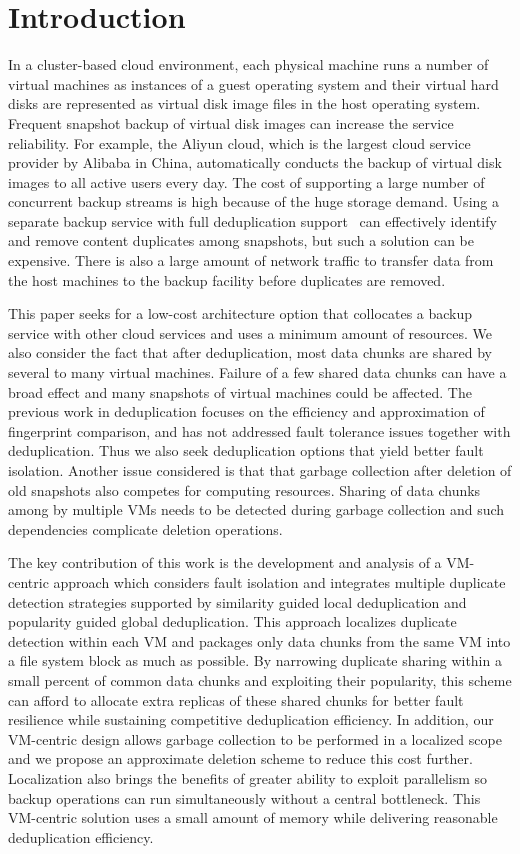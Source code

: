 \section{Introduction}
In a cluster-based cloud environment,
each physical machine runs a number  of virtual machines as  instances of a guest operating system 
and their  virtual hard disks are represented as virtual disk image files in the host operating system.
Frequent  snapshot backup of virtual disk images  can increase  the service reliability. 
For example, the Aliyun cloud, which is  the largest cloud service provider by Alibaba in China, 
automatically conducts  the backup of virtual disk images to all active users every day.
The cost of supporting a large number of concurrent backup streams is high
because of the huge storage demand. 
Using a separate  backup service with full deduplication support~\cite{venti02,bottleneck08}
can effectively identify and remove content duplicates among snapshots, 
but such a solution can be expensive. There is also a large amount of 
network traffic to transfer  data from the host machines to the backup facility
before duplicates are removed.

This paper seeks for a low-cost architecture option  that collocates
a backup service with other cloud services and  uses a minimum amount of resources. 
We also consider the fact that after
deduplication, most data chunks are shared by several to many virtual machines.
Failure of a few shared data chunks can have a 
broad effect and many
snapshots of virtual machines could be affected.
The previous work in deduplication focuses on the efficiency and approximation of
fingerprint comparison, and has not addressed fault tolerance issues  together with deduplication.
Thus we also seek deduplication options that yield better fault isolation.
Another issue considered is that
that garbage collection after deletion of old snapshots also competes for computing resources. 
Sharing of data chunks among by multiple VMs needs to be detected during
garbage collection and such dependencies complicate deletion operations. 

The key contribution of this work is the development and analysis of a VM-centric approach
which considers fault isolation and integrates  multiple duplicate detection strategies
supported by similarity guided local deduplication
and popularity guided global deduplication. 
This approach localizes duplicate detection within each VM  
and packages only data chunks from the same VM into a file system block as much as possible.
By narrowing duplicate sharing within a small percent of common data chunks and exploiting their popularity,
this scheme can afford to allocate extra replicas of these shared chunks for better
fault resilience while sustaining competitive deduplication efficiency.
In addition, our VM-centric design allows garbage collection to be performed in a localized
scope and we propose an approximate deletion scheme to reduce this cost further.
Localization also brings the benefits of greater ability to exploit parallelism so
backup operations can run simultaneously without a central  bottleneck.
This VM-centric solution uses a small amount of  memory while delivering reasonable deduplication efficiency. 

